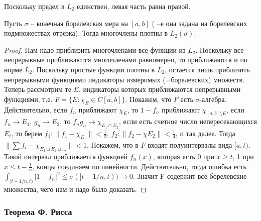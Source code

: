 \documentclass[a4paper]{article}
\begin{document}
Поскольку предел в $L_2$ единствен, левая часть равна правой.

\begin{lemma}
Пусть $\sigma$ -- конечная борелевская мера на $[a,b]$ ( --е она задана на борелевских подмножествах отрезка).
Тогда многочлены плотны в $L_2(\sigma)$.
\end{lemma}
\begin{proof}
Нам надо приблизить многочленами все функции из $L_2$. Поскольку
все непрерывные приближаются многочленами равномерно, то приближаются и по норме
$L_2$. Поскольку простые функции плотны в $L_2$, остается лишь приблизить непрерывными функциями
индикаторы измеримых (=борелевских) множеств. Теперь рассмотрим те $E$, индикаторы которых
приближаются непрерывными функциями, т.е. $F=\{E:\chi_E\in\overline{C[a,b]}\}$. Покажем, что $F$ есть
$\sigma$-алгебра. Действительно, если $f_n$ приближают $\chi_E$, то $1-f_n$ приближают
$\chi_{[a,b]\setminus E}$, если $f_n\to E_1$, $g_n\to E_2$, то $f_ng_n\to \chi_{E_1\cap E_2}$,
если есть счетное число непересекающихся $E_i$, то берем $f_1:\|f_1-\chi_{E_1}\|<\frac12$,
$f_2:\|f_2-\chi{E_2}\|<\frac14$, и так далее. Тогда $\|\sum f_i-\chi_{E_1\sqcup E_2\sqcup\ldots}\|<1$.
Покажем, что в $F$ входят полуинтервалы вида $[a,t)$. Такой интервал приближается функцией $f_n(x)$,
которая есть 0 при $x\ge t$, 1 при $x\le t-\frac{1}{n}$, концы соединяем по линейности. Действительно,
тогда ошибка есть $\int_{[t-1/n,t)} |1-f_n|^2 \le \sigma([t-1/n,t)) \to 0$.
Значит F содержит все борелевские множества, чего нам и надо было доказать.
\end{proof}

\subsubsection{Теорема Ф. Рисса}
\end{document}
